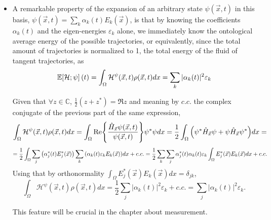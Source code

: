 \documentclass[11pt, a4paper]{article} %
\newcommand{\C}{\mathbb{C}}
\newcommand{\h}{\mathcal{H}}
\newcommand{\E}{\mathbb{E}}
\DeclareRobustCommand{\mybox}[2][gray!10]{%
\begin{tcolorbox}[   %
        left=0.2cm,
        right=0.2cm,
        top=0.15cm,
        bottom=0.15cm,
        colback=#1,
        colframe=#1,
        width=\dimexpr\textwidth\relax, 
        enlarge left by=0mm,
        boxsep=5pt,
        arc=0pt,outer arc=0pt,
        ]
        #2
\end{tcolorbox}
}
\begin{document}
\begin{itemize}
\item A remarkable property of the expansion of an arbitrary state $\psi(\vec{x},t)$ in this basis, $\psi(\vec{x},t)=\sum_{k} \alpha_k(t)E_k(\vec{x})$, is that by knowing the coefficients $\alpha_k(t)$ and the eigen-energies $\varepsilon_k$ alone, we immediately know the ontological average energy of the possible trajectories, or equivalently, since the total amount of trajectories is normalized to 1, the total energy of the fluid of tangent trajectories, as
\begin{equation}
\E\qty[\h; \psi](t)=\int_\Omega \h^\psi(\vec{x},t)\rho(\vec{x},t) dx = \sum_k |\alpha_k(t)|^2 \varepsilon_k
\end{equation}
\mybox{
Given that $\forall z\in\C$, $\frac{1}{2}(z+z^*)=\Re{z}$ and meaning by $c.c.$ the complex conjugate of the previous part of the same expression,
\begin{equation}
\int_\Omega \h^\psi(\vec{x},t)\rho(\vec{x},t) dx =\int_\Omega \Re{\frac{\hat{H}_{\vec{x}}\psi(\vec{x},t)}{\psi(\vec{x},t)}} \psi^*\psi dx =\frac{1}{2}\int_\Omega \qty(\psi^*\hat{H}_{\vec{x}}\psi+\psi\hat{H}_{\vec{x}}\psi^*)dx=
\end{equation}
$$
= \frac{1}{2}\int_\Omega\sum_j\qty(\alpha_j^*(t)E^*_j(\vec{x}))\sum_k\qty(\alpha_k(t)\varepsilon_k E_k(\vec{x})) dx+c.c.=\frac{1}{2}\sum_k\sum_j\alpha_j^*(t)\alpha_k(t)\varepsilon_k\int_{\Omega}E^*_j(\vec{x})E_k(\vec{x})dx +c.c.
$$
Using that by orthonormality $\int_\Omega E_j^*(\vec{x})E_k(\vec{x})dx=\delta_{jk}$,
\begin{equation}
\int_\Omega \h^\psi(\vec{x},t)\rho(\vec{x},t) dx =\frac{1}{2}\sum_j |\alpha_k(t)|^2\varepsilon_k+c.c.=\sum_j |\alpha_k(t)|^2\varepsilon_k.
\end{equation}
}
This feature will be crucial in the chapter about measurement.
\end{itemize}
\end{document}
